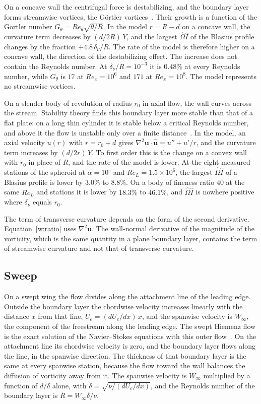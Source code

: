\documentclass[conf]{new-aiaa}
\begin{document}
On a concave wall the centrifugal force is destabilizing, and the boundary
layer forms streamwise vortices, the G\"ortler
vortices~\cite{saric_1994}. Their growth is a function of the G\"ortler
number $G_\theta=Re_\theta\sqrt{\theta/R}$. In the model $r=R-d$ on a
concave wall, the curvature term decreases by $(d/2R)\,Y$, and the largest
$\hat\Omega\hat I$ of the Blasius profile changes by the fraction
$+4.8\,\delta_\nu/R$. The rate of the model is therefore higher on a concave
wall, the direction of the destabilizing effect. The increase does not
contain the Reynolds number. At $\delta_\nu/R=10^{-3}$ it is $0.48\%$ at
every Reynolds number, while $G_\theta$ is $17$ at $Re_x=10^6$ and $171$ at
$Re_x=10^8$. The model represents no streamwise vortices.

On a slender body of revolution of radius $r_0$ in axial flow, the wall
curves across the stream. Stability theory finds this boundary layer more
stable than that of a flat plate: on a long thin cylinder it is stable below
a critical Reynolds number, and above it the flow is unstable only over a
finite distance~\cite{tutty_2002}. In the model, an axial velocity $u(r)$
with $r=r_0+d$ gives $\nabla^2\mathbf u\cdot\hat{\mathbf u}=u''+u'/r$, and
the curvature term increases by $(d/2r)\,Y$. To first order this is the
change on a convex wall with $r_0$ in place of $R$, and the rate of the model
is lower. At the eight measured stations of the spheroid at
$\alpha=10^\circ$ and $Re_L=1.5\times10^6$, the largest $\hat\Omega\hat I$ of
a Blasius profile is lower by $3.0\%$ to $8.8\%$. On a body of fineness ratio
$40$ at the same $Re_L$ and stations it is lower by $18.3\%$ to $46.1\%$, and
$\hat\Omega\hat I$ is nowhere positive where $\delta_\nu$ equals $r_0$.

The term of transverse curvature depends on the form of the second
derivative. Equation~\eqref{w:ratio} uses $\nabla^2\mathbf u$. The wall-normal
derivative of the magnitude of the vorticity, which is the same quantity in a
plane boundary layer, contains the term of streamwise curvature and not that
of transverse curvature.

\subsection{Sweep}

On a swept wing the flow divides along the attachment line of the leading
edge. Outside the boundary layer the chordwise velocity increases linearly
with the distance $x$ from that line, $U_e=(dU_e/dx)\,x$, and the spanwise
velocity is $W_\infty$, the component of the freestream along the leading
edge. The swept Hiemenz flow is the exact solution of the Navier--Stokes
equations with this outer flow~\cite{hall_malik_poll_1984}. On the attachment
line its chordwise velocity is zero, and the boundary layer flows along the
line, in the spanwise direction. The thickness of that boundary layer is the
same at every spanwise station, because the flow toward the wall balances
the diffusion of vorticity away from it. The spanwise velocity is $W_\infty$
multiplied by a function of $d/\delta$ alone, with
$\delta=\sqrt{\nu/(dU_e/dx)}$, and the Reynolds number of the boundary layer
is $\bar R=W_\infty\delta/\nu$.
\end{document}
